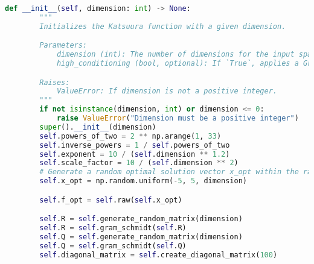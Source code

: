 \begin{lstlisting}[language=Python, caption=kontruktor kelas fungsi COCO, label=lst:init_coco]
    def __init__(self, dimension: int) -> None:
        """
        Initializes the Katsuura function with a given dimension.

        Parameters:
            dimension (int): The number of dimensions for the input space. Must be a positive integer.
            high_conditioning (bool, optional): If `True`, applies a Gram-Schmidt transformation to increase problem conditioning. Defaults to `False`.

        Raises:
            ValueError: If dimension is not a positive integer.
        """
        if not isinstance(dimension, int) or dimension <= 0:
            raise ValueError("Dimension must be a positive integer")
        super().__init__(dimension)
        self.powers_of_two = 2 ** np.arange(1, 33)
        self.inverse_powers = 1 / self.powers_of_two
        self.exponent = 10 / (self.dimension ** 1.2)
        self.scale_factor = 10 / (self.dimension ** 2)
        # Generate a random optimal solution vector x_opt within the range [-5, 5]
        self.x_opt = np.random.uniform(-5, 5, dimension)

        self.f_opt = self.raw(self.x_opt)

        self.R = self.generate_random_matrix(dimension)
        self.R = self.gram_schmidt(self.R)
        self.Q = self.generate_random_matrix(dimension)
        self.Q = self.gram_schmidt(self.Q)
        self.diagonal_matrix = self.create_diagonal_matrix(100)
\end{lstlisting}
